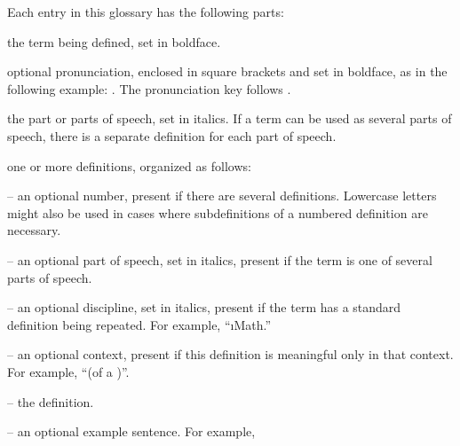 \def\Noun{\i{n.}}
\def\Verb{\i{v.}}
\def\TransitiveVerb{\i{v.t.}}
\def\Adjective{\i{adj.}}
\def\Adverb{\i{adv.}}

\def\ANSI{\i{ANSI}}
\def\IEEE{\i{IEEE}}
\def\ISO{\i{ISO}}
\def\Traditional{\i{Trad.}}
\def\Mathematics{\i{Math.}}
\def\Idiomatic{\i{Idiom.}}
\def\Computers{\i{Comp.}}

 
Each entry in this glossary has the following parts:
 
\beginlist
 
\item{\bull} the term being defined, set in boldface.
 
 \item{\bull} optional pronunciation, enclosed in square brackets and
set in boldface, as in the following example:
.  The pronunciation key follows
\WebstersDictionary\TypographyCaveats.
 
 \item{\bull} the part or parts of speech, set in italics.  If a term
can be used as several parts of speech, there is a separate definition
for each part of speech.
 
 \item{\bull} one or more definitions, organized as follows:
 
\beginlist
 
 \item{--} an optional number, present if there are several
definitions. Lowercase letters might also be used in cases where subdefinitions of
a numbered definition are necessary.
 
 \item{--} an optional part of speech, set in italics, present if the
term is one of several parts of speech.
 
 \item{--} an optional discipline, set in italics, present if the term
has a standard definition being repeated. For example, ``{\Mathematics}''
 
 \item{--} an optional context, present if this definition is
meaningful only in that context. For example, ``(of a )''.
 
 \item{--} the definition.
 
 \item{--} an optional example sentence. For example,
 
